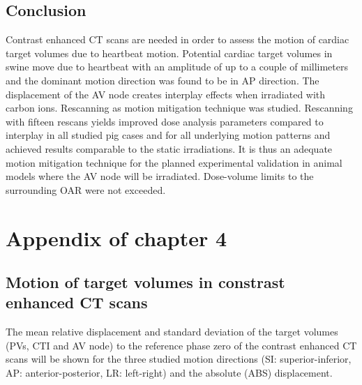 \documentclass[type=dr, dr=rernat, accentcolor=tud7b,colorbacktitle, bigchapter, openright, twoside, 12pt ]{tudthesis}
\begin{document}
\vspace*{-0.3cm}
\section{Conclusion}

Contrast enhanced CT scans are needed in order to assess the motion of cardiac target volumes due to heartbeat motion. 
Potential cardiac target volumes in swine move due to heartbeat with an amplitude of up to a couple of millimeters and the 
dominant motion direction was found to be in AP direction. The displacement of the AV node creates interplay effects when 
irradiated with carbon ions. Rescanning as motion mitigation technique was studied. 
Rescanning with fifteen rescans yields improved dose analysis parameters compared to interplay in all studied pig cases and for all 
underlying motion patterns and achieved results comparable to the static irradiations. It is thus an adequate motion mitigation technique for 
the planned experimental validation in animal models where the AV node will be irradiated. Dose-volume limits to the surrounding OAR were not 
exceeded. 

\newpage




\appendix

\chapter{Appendix of chapter 4}
\label{app:pigs}

\section{Motion of target volumes in constrast enhanced CT scans}
\label{app:pigs:motion}
The mean relative displacement and standard deviation of the target volumes (PVs, CTI and AV node) to the reference phase zero of the contrast enhanced CT scans 
will be shown for the three studied motion directions (SI: superior-inferior, AP: anterior-posterior, LR: left-right) and the absolute (ABS) 
displacement.
\end{document}
